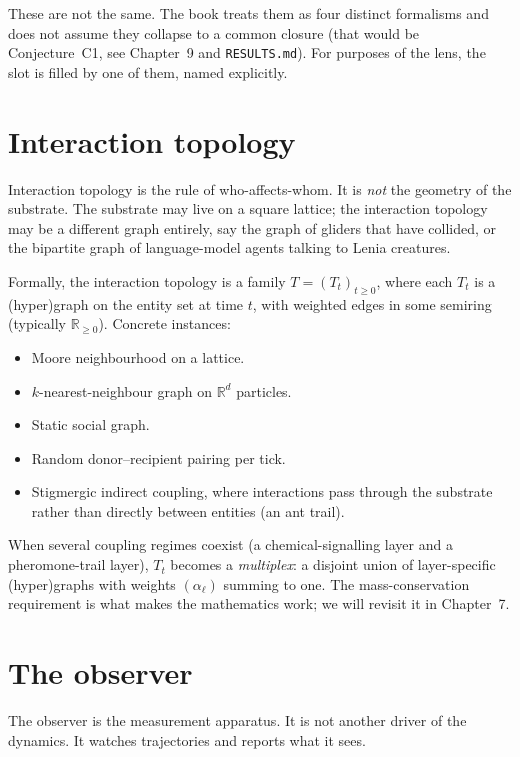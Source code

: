 These are not the same. The book treats them as four distinct
formalisms and does not assume they collapse to a common closure (that
would be Conjecture~C1, see Chapter~9 and \texttt{RESULTS.md}). For
purposes of the lens, the slot is filled by one of them, named
explicitly.

\section{Interaction topology}

Interaction topology is the rule of who-affects-whom. It is \emph{not}
the geometry of the substrate. The substrate may live on a square
lattice; the interaction topology may be a different graph entirely, say
the graph of gliders that have collided, or the bipartite graph of
language-model agents talking to Lenia creatures.

Formally, the interaction topology is a family $T = (T_t)_{t \geq 0}$,
where each $T_t$ is a (hyper)graph on the entity set at time $t$, with
weighted edges in some semiring (typically $\mathbb{R}_{\geq 0}$).
Concrete instances:

\begin{itemize}[leftmargin=1.5em,itemsep=2pt]
  \item Moore neighbourhood on a lattice.
  \item $k$-nearest-neighbour graph on $\mathbb{R}^d$ particles.
  \item Static social graph.
  \item Random donor--recipient pairing per tick.
  \item Stigmergic indirect coupling, where interactions pass through
    the substrate rather than directly between entities (an ant trail).
\end{itemize}

When several coupling regimes coexist (a chemical-signalling layer and
a pheromone-trail layer), $T_t$ becomes a \emph{multiplex}: a disjoint
union of layer-specific (hyper)graphs with weights $(\alpha_\ell)$
summing to one. The mass-conservation requirement is what makes the
mathematics work; we will revisit it in Chapter~7.

\section{The observer}

The observer is the measurement apparatus. It is not another driver of
the dynamics. It watches trajectories and reports what it sees.


